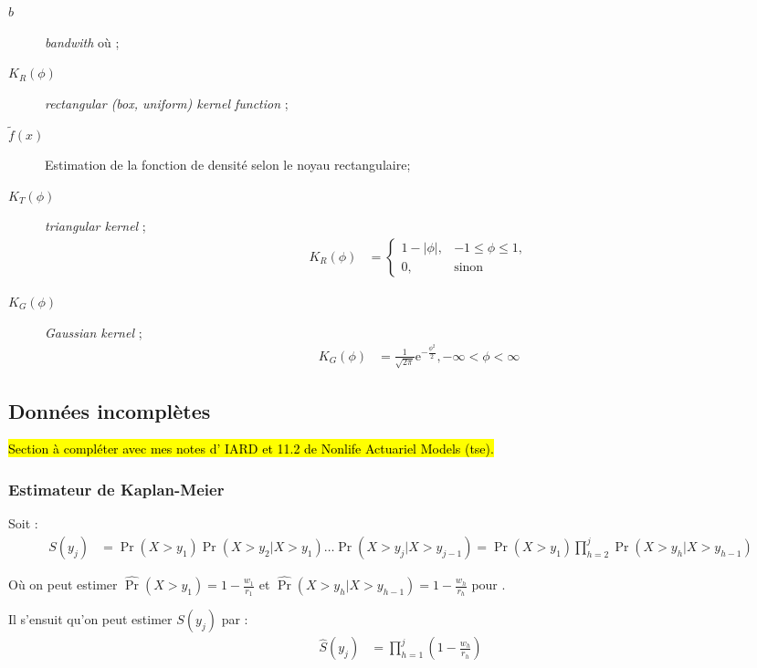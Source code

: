 \documentclass[10pt, french]{article}
\begin{document}
\begin{multicols*}{2}
\begin{distributions}[Notation]
\begin{description}
	\item[$b$]	\og \textit{bandwith} \fg{} où ;
	\item[$K_{R}(\phi)$]	\og \textit{rectangular (box, uniform) kernel function} \fg{};
	\item[$\tilde{f}(x)$]	Estimation de la fonction de densité selon le noyau rectangulaire;
	\item[$K_{T}(\phi)$]	\og \textit{triangular kernel} \fg{};
	\begin{align*}
		K_{R}(\phi)
		&=	\begin{cases}
			1 - |\phi|,	&	-1	\leq		\phi	\leq		1,	\\
			0,	&	\text{sinon}
			\end{cases}	
	\end{align*}
	\item[$K_{G}(\phi)$]	\og \textit{Gaussian kernel} \fg{};
		\begin{align*}
		K_{G}(\phi)
		&=	\frac{1}{\sqrt{2\pi}} \textrm{e}^{-\frac{\phi^{2}}{2}}, -\infty	<	\phi	<	\infty
		\end{align*}
\end{description}
\end{distributions}




\columnbreak
\subsection{Données incomplètes}
\hl{Section à compléter avec mes notes d’ IARD et 11.2 de Nonlife Actuariel Models (tse).}
\subsubsection{Estimateur de Kaplan-Meier}
Soit : 
\begin{align*}
	S(y_{j})
	&=	\Pr(X > y_{1})	\Pr(X > y_{2} | X > y_{1}) \hdots \Pr(X > y_{j} | X > y_{j - 1})
	=	\Pr(X > y_{1}) \prod_{h = 2}^{j} \Pr(X > y_{h} | X > y_{h - 1})
\end{align*}

Où on peut estimer $\widehat{\Pr}(X > y_{1})	=	1	-	\frac{w_{1}}{r_{1}}$ et $\widehat{\Pr}(X > y_{h} | X > y_{h - 1})	=	1	-	\frac{w_{h}}{r_{h}}$ pour .

Il s'ensuit qu'on peut estimer $S(y_{j})$ par :
\begin{align*}
	\hat{S}(y_{j})
	&=	\prod_{h = 1}^{j} \left(1 - \frac{w_{h}}{r_{h}}\right)
\end{align*}


\end{multicols*}
\end{document}
